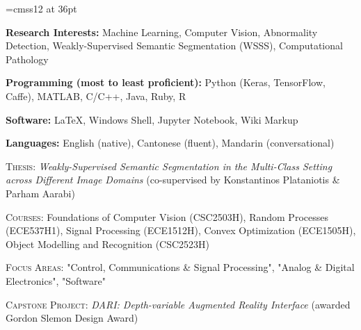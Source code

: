 \documentclass[11pt]{cv_style}
\begin{document}
\font\titlefont=cmss12 at 36pt


\begin{ditem}
	\item \textbf{Research Interests:} Machine Learning, Computer Vision, Abnormality Detection, Weakly-Supervised Semantic Segmentation (WSSS), Computational Pathology
	\item \textbf{Programming (most to least proficient):} Python (Keras, TensorFlow, Caffe), MATLAB, C/C++, Java, Ruby, R
	\item \textbf{Software:} \LaTeX, Windows Shell, Jupyter Notebook, Wiki Markup
	\item \textbf{Languages:} English (native), Cantonese (fluent), Mandarin (conversational)
\end{ditem}

\flushleft{}
\begin{ditem}
	\item \textsc{Thesis:} \textit{Weakly-Supervised Semantic Segmentation in the Multi-Class Setting across Different Image Domains} (co-supervised by Konstantinos Plataniotis \& Parham Aarabi)
	\item \textsc{Courses:} Foundations of Computer Vision (CSC2503H), Random Processes (ECE537H1), Signal Processing (ECE1512H), Convex Optimization (ECE1505H), Object Modelling and Recognition (CSC2523H)
\end{ditem}
\medspace
{}
\begin{ditem}
	\item \textsc{Focus Areas:} "Control, Communications \& Signal Processing", "Analog \& Digital Electronics", "Software"
	\item \textsc{Capstone Project:} \textit{DARI: Depth-variable Augmented Reality Interface} (awarded Gordon Slemon Design Award)
\end{ditem}
\end{document}
